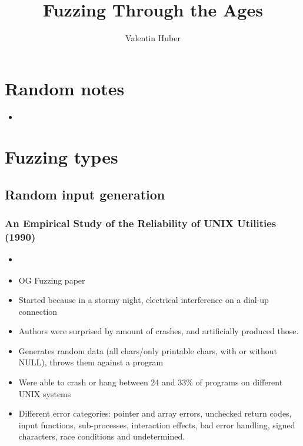 \documentclass[12pt]{article}
\title{Fuzzing Through the Ages}
\author{Valentin Huber}
\begin{document}


\maketitle
\tableofcontents

\section{Random notes}
\begin{itemize}
    \item {}\cite{DART}
\end{itemize}

\section{Fuzzing types}
\subsection{Random input generation}
\subsubsection{An Empirical Study of the Reliability of UNIX Utilities (1990)}
\begin{itemize}
    \item \cite{UNIX}
    \item OG Fuzzing paper
    \item Started because in a stormy night, electrical interference on a dial-up connection
    \item Authors were surprised by amount of crashes, and artificially produced those.
    \item Generates random data (all chars/only printable chars, with or without NULL), throws them against a program
    \item Were able to crash or hang between 24 and 33\% of programs on different UNIX systems
    \item Different error categories: pointer and array errors, unchecked return codes, input functions, sub-processes, interaction effects, bad error handling, signed characters, race conditions and undetermined.
\end{itemize}
\end{document}
